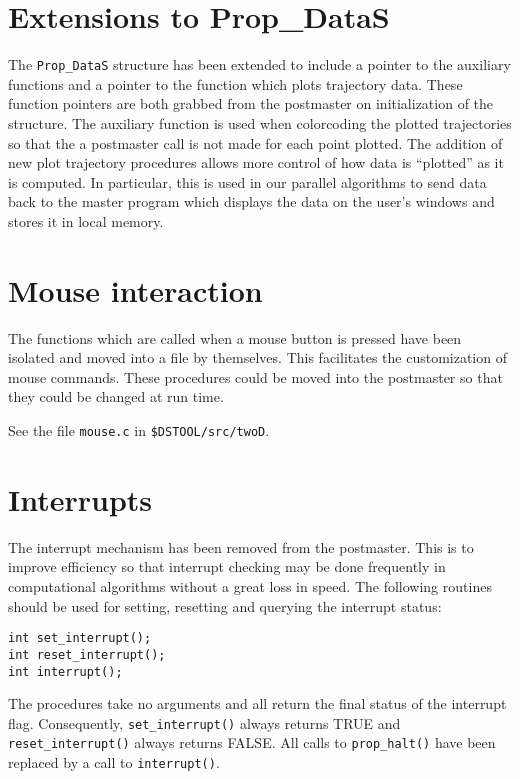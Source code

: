 \section{Extensions to Prop\_DataS}

The {\tt Prop\_DataS} structure has been extended to include
a pointer to the auxiliary functions and a pointer to the function 
which plots trajectory data.  These function pointers are both grabbed
from the postmaster on initialization of the structure.  The auxiliary
function is used when colorcoding the plotted trajectories so that
the a postmaster call is not made for each point plotted.   The
addition of new plot trajectory procedures allows more control
of how data is ``plotted'' as it is computed.  In particular, this
is used in our parallel algorithms to send data back to the
master program which displays the data on the user's windows and
stores it in local memory.


\section{Mouse interaction}

The functions which are called when a mouse button is pressed
have been isolated and moved into a file by themselves.  This
facilitates the customization of mouse commands.  These procedures
could be moved into the postmaster so that they could be changed
at run time.

See the file {\tt mouse.c} in {\tt \$DSTOOL/src/twoD}.



\section{Interrupts}

The interrupt mechanism has been removed from the postmaster.
This is to improve efficiency so that interrupt checking may be
done frequently in computational algorithms without a great
loss in speed.  The following routines should be used for
setting, resetting and querying the interrupt status:
\begin{verbatim}
int set_interrupt();
int reset_interrupt();
int interrupt();
\end{verbatim}
The procedures take no arguments and all return the final status of
the interrupt flag.  Consequently, {\tt set\_interrupt()}
always returns TRUE and {\tt reset\_interrupt()} always returns FALSE.
All calls to {\tt prop\_halt()} have been replaced by a call to 
{\tt interrupt()}.

